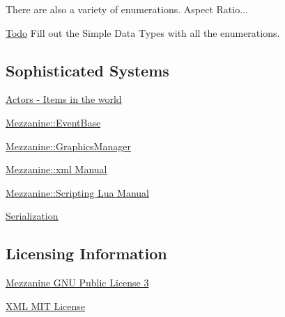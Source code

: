 \begin{DoxyParagraph}{There are also a variety of enumerations. Aspect Ratio...}

\end{DoxyParagraph}
\begin{Desc}
\item[\hyperlink{todo__todo000044}{Todo}]Fill out the Simple Data Types with all the enumerations.\end{Desc}
\hypertarget{index_Sophisticated}{}\subsection{Sophisticated Systems}\label{index_Sophisticated}
\hyperlink{classMezzanine_1_1ActorBase}{Actors -\/ Items in the world}

\hyperlink{classMezzanine_1_1EventBase}{Mezzanine::EventBase}

\hyperlink{classMezzanine_1_1GraphicsManager}{Mezzanine::GraphicsManager}

\hyperlink{XMLManual}{Mezzanine::xml Manual}

\hyperlink{LuaManual}{Mezzanine::Scripting Lua Manual}

\hyperlink{Serialization}{Serialization}\hypertarget{index_Licensing}{}\subsection{Licensing Information}\label{index_Licensing}
\hyperlink{GPLLicense}{Mezzanine GNU Public License 3}

\hyperlink{OriginalpugixmlLicense}{XML MIT License} 